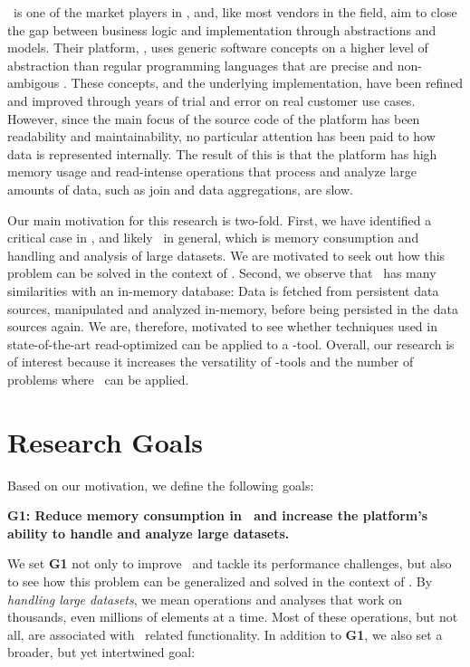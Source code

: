 \genus~is one of the market players in \mde, and, like most vendors in the field, aim to close the gap between business logic and implementation through abstractions and models. Their platform, \gap, uses generic software concepts on a higher level of abstraction than regular programming languages that are precise and non-ambigous \cite{noauthor_undated-qy}. These concepts, and the underlying implementation, have been refined and improved through years of trial and error on real customer use cases. However, since the main focus of the source code of the platform has been readability and maintainability, no particular attention has been paid to how data is represented internally. The result of this is that the platform has high memory usage and read-intense operations that process and analyze large amounts of data, such as join and data aggregations, are slow.

Our main motivation for this research is two-fold. First, we have identified a critical case in \gap, and likely \mde~in general, which is memory consumption and handling and analysis of large datasets. We are motivated to seek out how this problem can be solved in the context of \mdd. Second, we observe that \gap~has many similarities with an in-memory database: Data is fetched from persistent data sources, manipulated and analyzed in-memory, before being persisted in the data sources again. We are, therefore, motivated to see whether techniques used in state-of-the-art read-optimized can be applied to a \mde-tool. Overall, our research is of interest because it increases the versatility of \mdd-tools and the number of problems where \mde~can be applied.

\section{Research Goals}
\label{sec:Goals and Research Question}
Based on our motivation, we define the following goals:

\setlength{\leftskip}{1cm}

\textbf{G1: Reduce memory consumption in \gap~and increase the platform's ability to handle and analyze large datasets.}

\setlength{\leftskip}{0pt}

We set \textbf{G1} not only to improve \gap~and tackle its performance challenges, but also to see how this problem can be generalized and solved in the context of \mde. By \textit{handling large datasets}, we mean operations and analyses that work on thousands, even millions of elements at a time. Most of these operations, but not all, are associated with \bi~related functionality. In addition to \textbf{G1}, we also set a broader, but yet intertwined goal:

